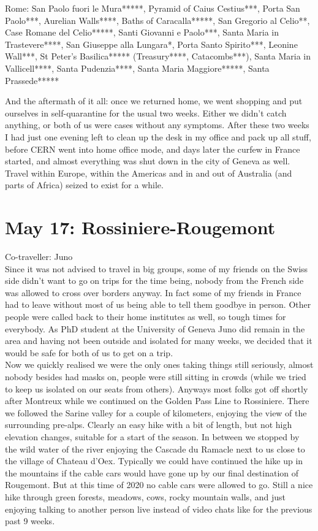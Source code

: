 Rome: San Paolo fuori le Mura*****, Pyramid of Caius Cestius***, Porta San Paolo***, Aurelian Walls****, Baths of Caracalla*****, San Gregorio al Celio**, Case Romane del Celio*****, Santi Giovanni e Paolo***, Santa Maria in Trastevere****, San Giuseppe alla Lungara*, Porta Santo Spirito***, Leonine Wall***, St Peter's Basilica***** (Treasury****, Catacombs***), Santa Maria in Vallicell****, Santa Pudenzia****, Santa Maria Maggiore*****, Santa Prassede***** %

 And the aftermath of it all: once we returned home, we went shopping and put ourselves in self-quarantine for the usual two weeks. Either we didn't catch anything, or both of us were cases without any symptoms. After these two weeks I had just one evening left to clean up the desk in my office and pack up all stuff, before CERN went into home office mode, and days later the curfew in France started, and almost everything was shut down in the city of Geneva as well. Travel within Europe, within the Americas and in and out of Australia (and parts of Africa) seized to exist for a while.\\
 
 \section{May 17: Rossiniere-Rougemont}
\label{2020:Rossiniere}

Co-traveller: Juno\\
Since it was not advised to travel in big groups, some of my friends on the Swiss side didn't want to go on trips for the time being, nobody from the French side was allowed to cross over borders anyway. In fact some of my friends in France had to leave without most of us being able to tell them goodbye in person. Other people were called back to their home institutes as well, so tough times for everybody. As PhD student at the University of Geneva Juno did remain in the area and having not been outside and isolated for many weeks, we decided that it would be safe for both of us to get on a trip.\\

Now we quickly realised we were the only ones taking things still seriously, almost nobody besides had masks on, people were still sitting in crowds (while we tried to keep us isolated on our seats from others). Anyways most folks got off shortly after Montreux while we continued on the Golden Pass Line to Rossiniere. There we followed the Sarine valley for a couple of kilometers, enjoying the view of the surrounding pre-alps. Clearly an easy hike with a bit of length, but not high elevation changes, suitable for a start of the season. In between we stopped by the wild water of the river enjoying the Cascade du Ramacle next to us close to the village of Chateau d'Oex. Typically we could have continued the hike up in the mountains if the cable cars would have gone up by our final destination of Rougemont. But at this time of 2020 no cable cars were allowed to go. Still a nice hike through green forests, meadows, cows, rocky mountain walls, and just enjoying talking to another person live instead of video chats like for the previous past 9 weeks.\\

